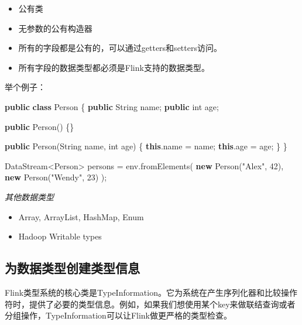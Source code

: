\documentclass[cn,11pt,chinese]{elegantbook}
\newenvironment{Shaded}{}{}
\newcommand{\BuiltInTok}[1]{#1}
\newcommand{\DataTypeTok}[1]{\textcolor[rgb]{0.56,0.13,0.00}{#1}}
\newcommand{\DecValTok}[1]{\textcolor[rgb]{0.25,0.63,0.44}{#1}}
\newcommand{\FunctionTok}[1]{\textcolor[rgb]{0.02,0.16,0.49}{#1}}
\newcommand{\KeywordTok}[1]{\textcolor[rgb]{0.00,0.44,0.13}{\textbf{#1}}}
\newcommand{\NormalTok}[1]{#1}
\newcommand{\StringTok}[1]{\textcolor[rgb]{0.25,0.44,0.63}{#1}}
\providecommand{\tightlist}{%
  \setlength{\itemsep}{0pt}\setlength{\parskip}{0pt}}
\begin{document}
\begin{itemize}
\tightlist
\item
  公有类
\item
  无参数的公有构造器
\item
  所有的字段都是公有的，可以通过getters和setters访问。
\item
  所有字段的数据类型都必须是Flink支持的数据类型。
\end{itemize}

举个例子：

\begin{Shaded}
\begin{Highlighting}[]
\KeywordTok{public} \KeywordTok{class}\NormalTok{ Person \{}
  \KeywordTok{public} \BuiltInTok{String}\NormalTok{ name;}
  \KeywordTok{public} \DataTypeTok{int}\NormalTok{ age;}

  \KeywordTok{public} \FunctionTok{Person}\NormalTok{() \{\}}

  \KeywordTok{public} \FunctionTok{Person}\NormalTok{(}\BuiltInTok{String}\NormalTok{ name, }\DataTypeTok{int}\NormalTok{ age) \{}
    \KeywordTok{this}\NormalTok{.}\FunctionTok{name}\NormalTok{ = name;}
    \KeywordTok{this}\NormalTok{.}\FunctionTok{age}\NormalTok{ = age;}
\NormalTok{  \}}
\NormalTok{\}}

\NormalTok{DataStream\textless{}Person\textgreater{} persons = env.}\FunctionTok{fromElements}\NormalTok{(}
  \KeywordTok{new} \FunctionTok{Person}\NormalTok{(}\StringTok{"Alex"}\NormalTok{, }\DecValTok{42}\NormalTok{),}
  \KeywordTok{new} \FunctionTok{Person}\NormalTok{(}\StringTok{"Wendy"}\NormalTok{, }\DecValTok{23}\NormalTok{)}
\NormalTok{);}
\end{Highlighting}
\end{Shaded}

\emph{其他数据类型}

\begin{itemize}
\tightlist
\item
  Array, ArrayList, HashMap, Enum
\item
  Hadoop Writable types
\end{itemize}

\hypertarget{ux4e3aux6570ux636eux7c7bux578bux521bux5efaux7c7bux578bux4fe1ux606f}{%
\subsection{为数据类型创建类型信息}\label{ux4e3aux6570ux636eux7c7bux578bux521bux5efaux7c7bux578bux4fe1ux606f}}

Flink类型系统的核心类是TypeInformation。它为系统在产生序列化器和比较操作符时，提供了必要的类型信息。例如，如果我们想使用某个key来做联结查询或者分组操作，TypeInformation可以让Flink做更严格的类型检查。
\end{document}
